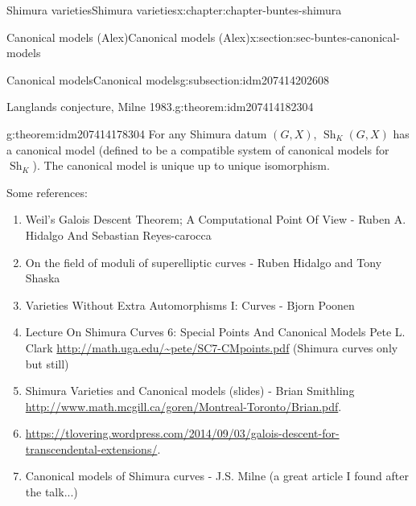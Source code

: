 \documentclass[oneside,10pt,]{book}
\numberwithin{equation}{section}
\begin{document}
\begin{chapterptx}{Shimura varieties}{}{Shimura varieties}{}{}{x:chapter:chapter-buntes-shimura}
\begin{sectionptx}{Canonical models (Alex)}{}{Canonical models (Alex)}{}{}{x:section:sec-buntes-canonical-models}
\begin{subsectionptx}{Canonical models}{}{Canonical models}{}{}{g:subsection:idm207414202608}
\begin{theorem}{Langlands conjecture, Milne 1983.}{}{g:theorem:idm207414182304}
\end{theorem}
\begin{theorem}{}{}{g:theorem:idm207414178304}%
For any Shimura datum \((G,X)\), \({\operatorname{Sh}}_K(G,X)\) has a canonical model (defined to be a compatible system of canonical models for \({\operatorname{Sh}}_K\)). The canonical model is unique up to unique isomorphism.%
\end{theorem}
Some references:%
\begin{enumerate}
\item{}Weil’s Galois Descent Theorem; A Computational Point Of View - Ruben A. Hidalgo And Sebastian Reyes-carocca%
\item{}On the field of moduli of superelliptic curves - Ruben Hidalgo and Tony Shaska%
\item{}Varieties Without Extra Automorphisms I: Curves - Bjorn Poonen%
\item{}Lecture On Shimura Curves 6: Special Points And Canonical Models Pete L. Clark \url{http://math.uga.edu/\~pete/SC7-CMpoints.pdf} (Shimura curves only but still)%
\item{}Shimura Varieties and Canonical models (slides) - Brian Smithling \url{http://www.math.mcgill.ca/goren/Montreal-Toronto/Brian.pdf}.%
\item{}\url{https://tlovering.wordpress.com/2014/09/03/galois-descent-for-transcendental-extensions/}.%
\item{}Canonical models of Shimura curves -  J.S. Milne (a great article I found after the talk...)%
\end{enumerate}
%
\end{subsectionptx}
\end{sectionptx}
\end{chapterptx}
%
%
\typeout{************************************************}
\typeout{************************************************}
%
\end{document}
